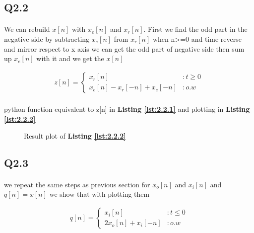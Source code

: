 \subsection{Q2.2}
\paragraph{} We can rebuild $x[n]$ with $x_e[n]$
and $x_r[n]$. First we find the odd part in the negative
side by subtracting $x_e[n]$ from $x_r[n]$ when n>=0 and 
time reverse and mirror respect to x axis we can get the odd
part of negative side then sum up $x_e[n]$ with it and we get the 
$x[n]$

\begin{align}
    z[n] = \begin{cases}
    x_r[n] &: t \geq 0\\
    x_e[n] -x_r[-n]+x_e[-n]&: o.w\end{cases}
   \end{align}
\paragraph{} python function equivalent to z[n] in \textbf{Listing \ref{lst:2.2.1}}
and plotting in \textbf{Listing \ref{lst:2.2.2}}
   
\vspace{2ex}

\vspace{2ex}

\begin{figure}[H]
    \resizebox{\textwidth}{!}{}
    \caption{Result plot of \textbf{Listing \ref{lst:2.2.2}}}
    \label{fig:q2.2}
\end{figure}

\subsection{Q2.3}
\paragraph{} we repeat the same steps as previous section for
$x_o[n]$ and $x_i[n]$ and $q[n] = x[n]$ we show that with plotting them

\begin{align}
    q[n] = \begin{cases}
        x_i[n] &: t \le 0\\
        2x_o[n]+x_i[-n]&: o.w\end{cases}
   \end{align}

